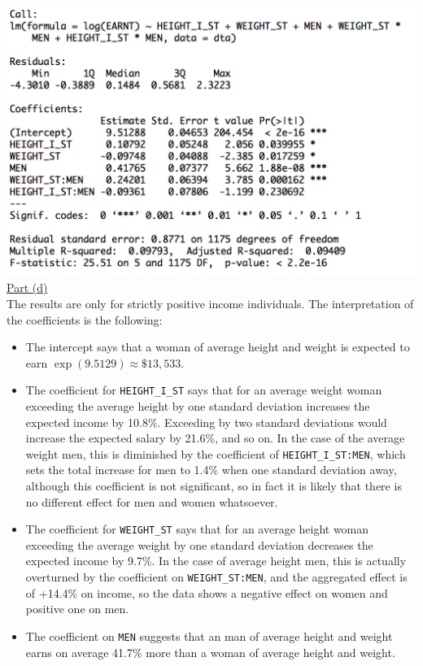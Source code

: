 \documentclass[a4paper, 11pt]{article}
\begin{document}
\includegraphics[scale=0.7]{reg4.png}
\newline \\
\newline \underline{Part (d)}\\
\newline The results are only for strictly positive income individuals. The interpretation of the coefficients is the following:
\begin{itemize}
\item The intercept says that a woman of average height and weight is expected to earn $\exp{(9.5129)} \approx \$13,533$.
\item The coefficient for \texttt{HEIGHT\_I\_ST} says that for an average weight woman exceeding the average height by one standard deviation increases the expected income by 10.8\%. Exceeding by two standard deviations would increase the expected salary by 21.6\%, and so on. In the case of the average weight men, this is diminished by the coefficient of \texttt{HEIGHT\_I\_ST:MEN}, which sets the total increase for men to 1.4\% when one standard deviation away, although this coefficient is not significant, so in fact it is likely that there is no different effect for men and women whatsoever.
\item The coefficient for \texttt{WEIGHT\_ST} says that for an average height woman exceeding the average weight by one standard deviation decreases the expected income by 9.7\%. In the case of average height men, this is actually overturned by the coefficient on \texttt{WEIGHT\_ST:MEN}, and the aggregated effect is of +14.4\% on income, so the data shows a negative effect on women and positive one on men.
\item The coefficient on \texttt{MEN} suggests that an man of average height and weight earns on average 41.7\% more than a woman of average height and weight.
\end{itemize}
\end{document}
